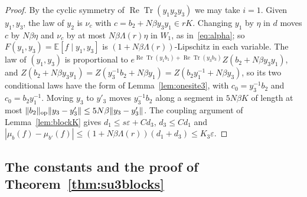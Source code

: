 \documentclass[aps,prd,twocolumn,superscriptaddress,nofootinbib,longbibliography,floatfix,amsmath,amssymb,10pt]{revtex4-2}
\theoremstyle{definition}
\theoremstyle{remark}
\newcommand{\E}{\mathbb{E}}
\newcommand{\ReTr}{\operatorname{Re}\operatorname{Tr}}
\begin{document}
\begin{proof}
By the cyclic symmetry of $\ReTr(y_1y_2y_3)$ we may take $i=1$. Given
$y_1,y_3$, the law of $y_2$ is $\nu_c$ with $c=b_2+N\beta y_3y_1\in rK$.
Changing $y_1$ by $\eta$ in $d$ moves $c$ by $N\beta\eta$ and $\nu_c$ by at most
$N\beta\Lambda(r)\eta$ in $W_1$, as in~\eqref{eq:alpha}; so $F(y_1,y_3)=
\E[f\mid y_1,y_3]$ is $(1+N\beta\Lambda(r))$-Lipschitz in each variable. The
law of $(y_1,y_3)$ is proportional to $e^{\ReTr(y_1b_1)+\ReTr(y_3b_3)}
Z(b_2+N\beta y_3y_1)$, and $Z(b_2+N\beta y_3y_1)=Z(y_3^{-1}b_2+N\beta y_1)=
Z(b_2y_1^{-1}+N\beta y_3)$, so its two conditional laws have the form of
Lemma~\ref{lem:onesite3}, with $c_0=y_3^{-1}b_2$ and $c_0=b_2y_1^{-1}$.
Moving $y_3$ to $y'_3$ moves $y_3^{-1}b_2$ along a segment in $5N\beta K$ of
length at most $\|b_2\|_{\rm op}\|y_3-y'_3\|\le5N\beta\|y_3-y'_3\|$. The
coupling argument of Lemma~\ref{lem:blockK} gives $d_1\le s\varepsilon+
Cd_3$, $d_3\le Cd_1$ and $|\mu_b(f)-\mu_{b'}(f)|\le(1+N\beta\Lambda(r))(d_1+
d_3)\le K_3\varepsilon$.
\end{proof}

\subsection{The constants and the proof of Theorem~\ref{thm:su3blocks}}
\end{document}
